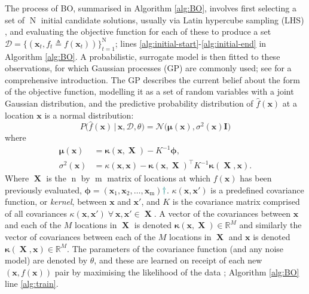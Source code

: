 \documentclass[conference]{IEEEtran}
\DeclareMathOperator*{\evaluatedx}{\bX}
\DeclareMathOperator*{\ninitialevaluations}{N}
\DeclareMathOperator*{\nevaluations}{m}
\DeclareMathOperator*{\ndim}{n}
\newcommand\gp{GP\xspace}
\newcommand{\given}{\,|\,}
\newcommand{\bx}{\mathbf{x}}
\newcommand{\bX}{\mathbf{X}}
\newcommand{\bI}{\mathbf{I}}
\newcommand{\bmu}{\boldsymbol{\mu}}
\newcommand{\bphi}{\boldsymbol{\phi}}
\newcommand{\fnote}[2][\textcolor{teal}{\dagger}]{$#1$\marginpar{\color{teal}\raggedright\tiny$#1$
    #2}}
\begin{document}
The process of BO, summarised in Algorithm \ref{alg:BO}, involves first selecting a set of $\ninitialevaluations$ initial candidate solutions, usually via Latin hypercube sampling (LHS) \cite{mckay2000comparison}, and evaluating the objective function for each of these to produce a set $\mathcal{D} = \{ (\bx_t, f_t \triangleq f(\bx_t) )\}_{t=1}^{\ninitialevaluations}$; lines \ref{alg:initial-start}-\ref{alg:initial-end} in Algorithm \ref{alg:BO}. A probabilistic, surrogate model is then fitted to these observations, for which  Gaussian processes (\gp) are commonly used; see \cite{rasmussen2003gaussian} for a comprehensive introduction.
The \gp describes the current belief about the form of the objective function, modelling it as a set of random variables with a joint Gaussian distribution, and the predictive probability distribution of $\hat{f}(\bx)$ at a location $\bx$ is a normal distribution:
\begin{equation}\label{eqn: P(f_t+1)}
P\big(\hat{f}(\mathbf{x}) \given \mathbf{x}, \mathcal{D}, \theta \big) = 
\mathcal{N}\big(\bmu(\mathbf{x}), \sigma^2(\mathbf{x})\bI\big)
\end{equation}
where
\begin{align}\label{eqn: mu}
\bmu(\mathbf{x}) &= \boldsymbol{\kappa}(\mathbf{x}, \evaluatedx) - K^{-1}  \bphi,\\
\label{eqn: sigma}
\sigma^2(\mathbf{x}) &= \kappa(\mathbf{x}, \mathbf{x}) - \boldsymbol{\kappa}(\mathbf{x}, \evaluatedx)^{\top}K^{-1} \boldsymbol{\kappa}(\evaluatedx, \mathbf{x}).
\end{align}
Where $\evaluatedx$ is the $\ndim$ by $\nevaluations$ matrix of locations at which $f(\bx)$ has
been previously evaluated, $\bphi = (\bx_1, \bx_2, \ldots, \bx_{\nevaluations})$\fnote{check $\nevaluations$ correct here?}.
$\kappa(\mathbf{x}, \mathbf{x}')$ is a predefined
covariance function, or  \textit{kernel}, between $\mathbf{x}$ and
$\mathbf{x}'$, and  $K$ is the covariance matrix comprised of all
covariances $\kappa(\mathbf{x}, \mathbf{x}') \; \forall \: \mathbf{x},
\mathbf{x}'\in \evaluatedx$. A vector of the covariances between
$\mathbf{x}$ and each of the $M$ locations in $\evaluatedx$ is denoted
$\boldsymbol{\kappa}(\mathbf{x}, \evaluatedx)\in \mathbb{R}^{M}$ and
similarly the vector of covariances between each of the $M$ locations in
$\evaluatedx$ and $\mathbf{x}$ is denoted $\boldsymbol{\kappa}(\evaluatedx,
\mathbf{x}) \in \mathbb{R}^{M}$. The parameters of the covariance function
(and any noise model) are denoted by $\theta$, and these are learned on receipt of each new $(\bx, f(\bx))$ pair by maximising the likelihood of the data \cite{rasmussen2003gaussian}; Algorithm \ref{alg:BO} line \ref{alg:train}. 
\end{document}
